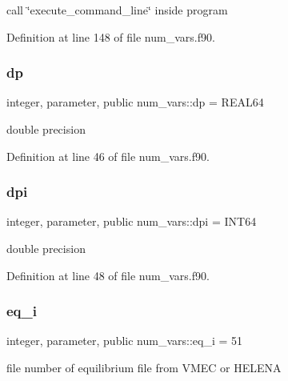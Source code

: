 call \char`\"{}execute\+\_\+command\+\_\+line\char`\"{} inside program 



Definition at line 148 of file num\+\_\+vars.\+f90.

\mbox{\label{namespacenum__vars_a03802aa2bd86439d7a9370836fabf3f2}} 
\subsubsection{\texorpdfstring{dp}{dp}}
{\footnotesize\ttfamily integer, parameter, public num\+\_\+vars\+::dp = R\+E\+A\+L64}



double precision 



Definition at line 46 of file num\+\_\+vars.\+f90.

\mbox{\label{namespacenum__vars_a7e4915cb055749f1170afaa77b055cd5}} 
\subsubsection{\texorpdfstring{dpi}{dpi}}
{\footnotesize\ttfamily integer, parameter, public num\+\_\+vars\+::dpi = I\+N\+T64}



double precision 



Definition at line 48 of file num\+\_\+vars.\+f90.

\mbox{\label{namespacenum__vars_a7b97a4fd25cbf874cbfe63417ba307ff}} 
\subsubsection{\texorpdfstring{eq\+\_\+i}{eq\_i}}
{\footnotesize\ttfamily integer, parameter, public num\+\_\+vars\+::eq\+\_\+i = 51}



file number of equilibrium file from V\+M\+EC or H\+E\+L\+E\+NA 



